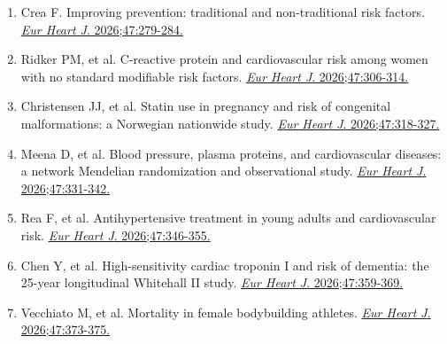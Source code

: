 \documentclass[12pt,a4paper]{article}
\begin{document}
\begin{enumerate}
    \item Crea F. Improving prevention: traditional and non-traditional risk factors. \href{https://doi.org/10.1093/eurheartj/ehaf1092}{\textit{Eur Heart J}. 2026;47:279-284.}

    \item Ridker PM, et al. C-reactive protein and cardiovascular risk among women with no standard modifiable risk factors. \href{https://doi.org/10.1093/eurheartj/ehaf658}{\textit{Eur Heart J}. 2026;47:306-314.}

    \item Christensen JJ, et al. Statin use in pregnancy and risk of congenital malformations: a Norwegian nationwide study. \href{https://doi.org/10.1093/eurheartj/ehaf592}{\textit{Eur Heart J}. 2026;47:318-327.}

    \item Meena D, et al. Blood pressure, plasma proteins, and cardiovascular diseases: a network Mendelian randomization and observational study. \href{https://doi.org/10.1093/eurheartj/ehaf725}{\textit{Eur Heart J}. 2026;47:331-342.}

    \item Rea F, et al. Antihypertensive treatment in young adults and cardiovascular risk. \href{https://doi.org/10.1093/eurheartj/ehaf744}{\textit{Eur Heart J}. 2026;47:346-355.}

    \item Chen Y, et al. High-sensitivity cardiac troponin I and risk of dementia: the 25-year longitudinal Whitehall II study. \href{https://doi.org/10.1093/eurheartj/ehaf834}{\textit{Eur Heart J}. 2026;47:359-369.}

    \item Vecchiato M, et al. Mortality in female bodybuilding athletes. \href{https://doi.org/10.1093/eurheartj/ehaf789}{\textit{Eur Heart J}. 2026;47:373-375.}
\end{enumerate}
\end{document}

